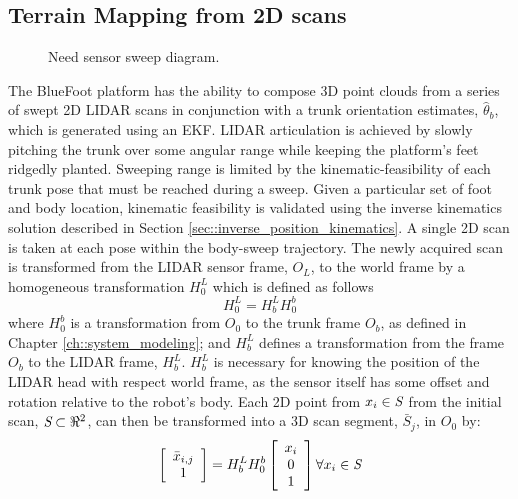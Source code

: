 		\subsection{Terrain Mapping from 2D scans}
			\label{ssec::terrain_mapping}
			\begin{figure}[h!]
				\centering
				\caption{Need sensor sweep diagram.}
				\label{fig::sensor_sweep}
			\end{figure}
			The BlueFoot platform has the ability to compose 3D point clouds from a series of swept 2D LIDAR scans in conjunction with a trunk orientation estimates, $\hat{\theta}_{b}$, which is generated using an EKF. LIDAR articulation is achieved by slowly pitching the trunk over some angular range while keeping the platform's feet ridgedly planted. Sweeping range is limited by the kinematic-feasibility of each trunk pose that must be reached during a sweep. Given a particular set of foot and body location, kinematic feasibility is validated using the inverse kinematics solution described in Section \ref{sec::inverse_position_kinematics}. A single 2D scan is taken at each pose within the body-sweep trajectory. The newly acquired scan is transformed from the LIDAR sensor frame, $O_{L}$, to the world frame by a homogeneous transformation $H^{L}_{0}$ which is defined as follows
				\begin{equation}
					H^{L}_{0} = H^{L}_{b} H^{b}_{0}
					\label{eq::world_to_sensor}
				\end{equation}
			where $H^{b}_{0}$ is a transformation from $O_{0}$ to the trunk frame $O_{b}$, as defined in Chapter \ref{ch::system_modeling}; and $H^{L}_{b}$ defines a transformation from the frame $O_{b}$ to the LIDAR frame, $H^{L}_{b}$. $H^{L}_{b}$ is necessary for knowing the position of the LIDAR head with respect world frame, as the sensor itself has some offset and rotation relative to the robot's body. Each 2D point from $x_{i} \in \emph{S}$ from the initial scan, $\emph{S}\subset \Re^{2}$, can then be transformed into a 3D scan segment, $\bar{S}_{j}$, in $O_{0}$ by:
				\begin{equation}
					\left[
						\begin{array}{c}
							\bar{x}_{i,j} \\ 1
						\end{array}
					\right]
				 = H^{L}_{b} H^{b}_{0}	
					\left[
						\begin{array}{c}
							x_{i} \\ 0 \\ 1
						\end{array}
					\right] \forall x_{i} \in \emph{S}
					\label{eq::scan_to_segment}
				\end{equation}
